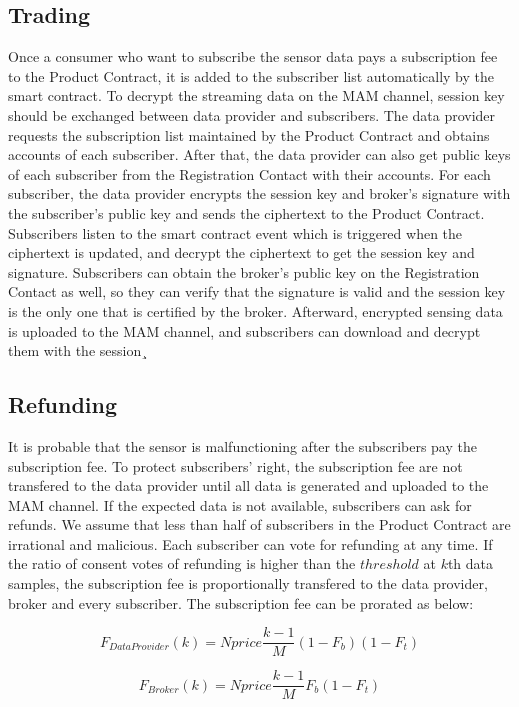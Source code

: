 \documentclass[journal,a4paper]{IEEEtran}
\begin{document}
\subsection{Trading}
Once a consumer who want to subscribe the sensor data pays a subscription fee to the Product Contract, it is added to the subscriber list automatically by the smart contract. To decrypt the streaming data on the MAM channel, session key should be exchanged between data provider and subscribers. The data provider requests the subscription list maintained by the Product Contract and obtains accounts of each subscriber. After that, the data provider can also get public keys of each subscriber from the Registration Contact with their accounts. For each subscriber, the data provider encrypts the session key and broker's signature with the subscriber's public key and sends the ciphertext to the Product Contract. Subscribers listen to the smart contract event which is triggered when the ciphertext is updated, and decrypt the ciphertext to get the session key and signature. Subscribers can obtain the broker's public key on the Registration Contact as well, so they can verify that the signature is valid and the session key is the only one that is certified by the broker. Afterward, encrypted sensing data is uploaded to the MAM channel, and subscribers can download and decrypt them with the session¸

\subsection{Refunding}
It is probable that the sensor is malfunctioning after the subscribers pay the subscription fee. To protect subscribers' right, the subscription fee are not transfered to the data provider until all data is generated and uploaded to the MAM channel. If the expected data is not available, subscribers can ask for refunds. We assume that less than half of subscribers in the Product Contract are irrational and malicious. Each subscriber can vote for refunding at any time. If the ratio of consent votes of refunding is higher than the $threshold$ at $k$th data samples, the subscription fee is proportionally transfered to the data provider, broker and every subscriber. The subscription fee can be prorated as below:

\begin{equation}
F_{DataProvider}(k) = N price \frac{k-1}{M} (1-F_{b}) (1-F_{t})
\end{equation}

\begin{equation}
F_{Broker}(k) = N price \frac{k-1}{M} F_{b} (1-F_{t})
\end{equation}
\end{document}
